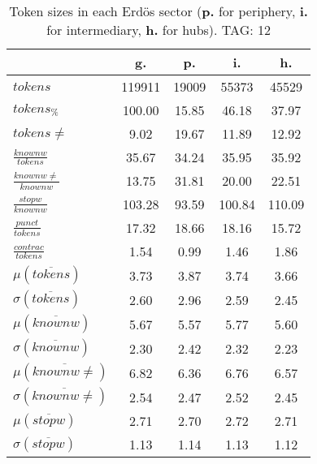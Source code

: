 \begin{table}[h!]
\begin{center}
\begin{tabular}{| l || c | c | c | c |}\hline
 & {\bf g.} & {\bf p.} & {\bf i.} & {\bf h.} \\\hline\hline
$tokens$ & 119911  & 19009  & 55373  & 45529 \\
$tokens_{\%}$ & 100.00  & 15.85  & 46.18  & 37.97 \\
$tokens \neq$ & 9.02  & 19.67  & 11.89  & 12.92 \\\hline
$\frac{knownw}{tokens}$ & 35.67  & 34.24  & 35.95  & 35.92 \\
$\frac{knownw \neq}{knownw}$ & 13.75  & 31.81  & 20.00  & 22.51 \\\hline
$\frac{stopw}{knownw}$ & 103.28  & 93.59  & 100.84  & 110.09 \\
$\frac{punct}{tokens}$ & 17.32  & 18.66  & 18.16  & 15.72 \\
$\frac{contrac}{tokens}$ & 1.54  & 0.99  & 1.46  & 1.86 \\\hline\hline
$\mu(\overline{tokens})$ & 3.73  & 3.87  & 3.74  & 3.66 \\
$\sigma(\overline{tokens})$ & 2.60  & 2.96  & 2.59  & 2.45 \\\hline
$\mu(\overline{knownw})$ & 5.67  & 5.57  & 5.77  & 5.60 \\
$\sigma(\overline{knownw})$ & 2.30  & 2.42  & 2.32  & 2.23 \\\hline
$\mu(\overline{knownw \neq})$ & 6.82  & 6.36  & 6.76  & 6.57 \\
$\sigma(\overline{knownw \neq})$ & 2.54  & 2.47  & 2.52  & 2.45 \\\hline
$\mu(\overline{stopw})$ & 2.71  & 2.70  & 2.72  & 2.71 \\
$\sigma(\overline{stopw})$ & 1.13  & 1.14  & 1.13  & 1.12 \\\hline
\end{tabular}
\caption{Token sizes in each Erd\"os sector ({{\bf p.}} for periphery, {{\bf i.}} for intermediary, {{\bf h.}} for hubs). TAG: 12}
\end{center}
\end{table}